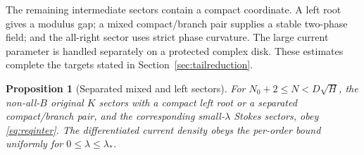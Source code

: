 \documentclass[11pt]{article}
\numberwithin{equation}{section}
\newtheorem{proposition}[theorem]{Proposition}
\theoremstyle{definition}
\begin{document}
The remaining intermediate sectors contain a compact coordinate.
A left root gives a modulus gap; a mixed compact/branch pair supplies
a stable two-phase field; and the all-right sector uses strict phase
curvature. The large current parameter is handled separately on a
protected complex disk. These estimates complete the targets stated
in Section~\ref{sec:tailreduction}.
\begin{proposition}[Separated mixed and left sectors]\label{prop:mixed}
For \(N_0+2\le N<D\sqrt H\), the non-all-\(B\) original \(K\)
sectors with a compact left root or a separated compact/branch
pair, and the corresponding small-\(\lambda\) Stokes sectors,
obey \eqref{eq:reqinter}. The differentiated current density
obeys the per-order bound uniformly for \(0\le\lambda\le\lambda_*\).
\end{proposition}
\end{document}
